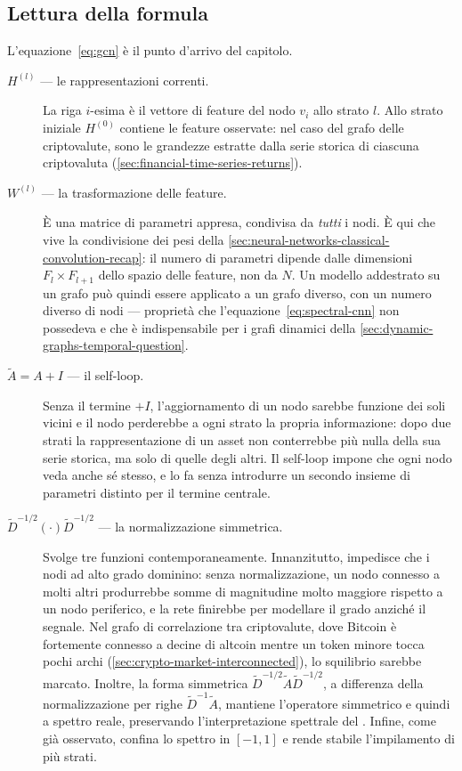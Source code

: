 \subsection{Lettura della formula}

L'equazione~\eqref{eq:gcn} è il punto d'arrivo del capitolo.

\begin{description}
    \item[$H^{(l)}$ — le rappresentazioni correnti.] La riga $i$-esima è il vettore di feature del nodo $v_i$ allo strato $l$. Allo strato iniziale $H^{(0)}$ contiene le feature osservate: nel caso del grafo delle criptovalute, sono le grandezze estratte dalla serie storica di ciascuna criptovaluta (\cref{sec:financial-time-series-returns}).
    \item[$W^{(l)}$ — la trasformazione delle feature.] È una matrice di parametri appresa, condivisa da \emph{tutti} i nodi. È qui che vive la condivisione dei pesi della \cref{sec:neural-networks-classical-convolution-recap}: il numero di parametri dipende dalle dimensioni $F_l\times F_{l+1}$ dello spazio delle feature, non da $N$. Un modello addestrato su un grafo può quindi essere applicato a un grafo diverso, con un numero diverso di nodi — proprietà che l'equazione~\eqref{eq:spectral-cnn} non possedeva e che è indispensabile per i grafi dinamici della \cref{sec:dynamic-graphs-temporal-question}.
    \item[$\tilde A = A + I$ — il self-loop.] Senza il termine $+I$, l'aggiornamento di un nodo sarebbe funzione dei soli vicini e il nodo perderebbe a ogni strato la propria informazione: dopo due strati la rappresentazione di un asset non conterrebbe più nulla della sua serie storica, ma solo di quelle degli altri. Il self-loop impone che ogni nodo veda anche sé stesso, e lo fa senza introdurre un secondo insieme di parametri distinto per il termine centrale.
    \item[$\tilde D^{-1/2}(\cdot)\tilde D^{-1/2}$ — la normalizzazione simmetrica.] Svolge tre funzioni contemporaneamente. Innanzitutto, impedisce che i nodi ad alto grado dominino: senza normalizzazione, un nodo connesso a molti altri produrrebbe somme di magnitudine molto maggiore rispetto a un nodo periferico, e la rete finirebbe per modellare il grado anziché il segnale. Nel grafo di correlazione tra criptovalute, dove Bitcoin è fortemente connesso a decine di altcoin mentre un token minore tocca pochi archi (\cref{sec:crypto-market-interconnected}), lo squilibrio sarebbe marcato. Inoltre, la forma simmetrica $\tilde D^{-1/2}\tilde A\tilde D^{-1/2}$, a differenza della normalizzazione per righe $\tilde D^{-1}\tilde A$, mantiene l'operatore simmetrico e quindi a spettro reale, preservando l'interpretazione spettrale del . Infine, come già osservato, confina lo spettro in $[-1,1]$ e rende stabile l'impilamento di più strati.
\end{description}

